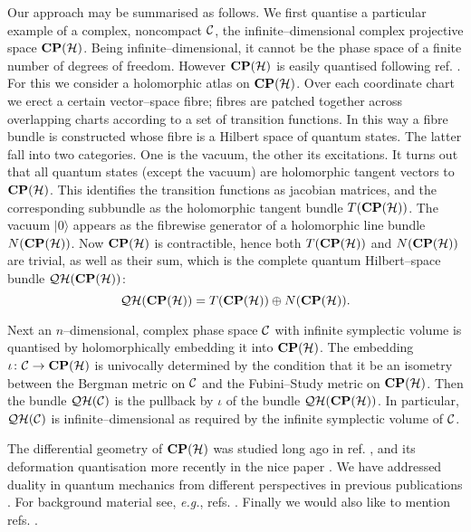 \documentclass[a4paper,a4paper]{article}
\begin{document}
Our approach may be summarised as follows. We first quantise a particular example of a complex, 
noncompact ${\cal C}$, the infinite--dimensional complex projective space ${\bf CP}({\cal H})$. 
Being infinite--dimensional, it cannot be the phase space of a finite number of degrees of freedom. 
However ${\bf CP}({\cal H})$ is easily quantised following ref. \cite{PQM}. For this
we consider a holomorphic atlas on ${\bf CP}({\cal H})$. Over each coordinate chart 
we erect a certain vector--space fibre; fibres are patched together across overlapping charts 
according to a set of transition functions. In this way a fibre bundle is constructed whose fibre 
is a Hilbert space of quantum states. The latter fall into two categories. 
One is the vacuum, the other its excitations. 
It turns out that all quantum states (except the vacuum) are holomorphic tangent vectors 
to ${\bf CP}({\cal H})$. This identifies the transition functions as jacobian matrices, 
and the corresponding subbundle as the holomorphic tangent bundle $T({\bf CP}({\cal H}))$. 
The vacuum $\vert 0\rangle$ appears as the fibrewise generator of a holomorphic line bundle 
$N({\bf CP}({\cal H}))$. Now ${\bf CP}({\cal H})$ is contractible, hence both 
$T({\bf CP}({\cal H}))$ and $N({\bf CP}({\cal H}))$ are trivial, as well as their sum, which is 
the complete quantum Hilbert--space bundle ${\cal QH}({\bf CP}({\cal H}))$:
\begin{equation}
{\cal QH}({\bf CP}({\cal H}))=T({\bf CP}({\cal H}))\oplus N({\bf CP}({\cal H})).
\label{compelto}
\end{equation}

Next an $n$--dimensional, complex phase space ${\cal C}$ with infinite symplectic 
volume is quantised by holomorphically embedding it into ${\bf CP}({\cal 
H})$. The embedding $\iota\colon {\cal C}\rightarrow {\bf CP}({\cal H})$ 
is univocally determined by the condition that it be an isometry between 
the Bergman metric on ${\cal C}$ and the Fubini--Study metric on ${\bf CP}({\cal H})$. 
Then the bundle ${\cal QH}({\cal C})$ is the pullback by $\iota$ of the 
bundle ${\cal QH}({\bf CP}({\cal H}))$. 
In particular, ${\cal QH}({\cal C})$ is infinite--dimensional as required by the 
infinite symplectic volume of ${\cal C}$.

The differential geometry of ${\bf CP}({\cal H})$ was studied long ago in ref. \cite{CPINF},
and its deformation quantisation more recently in the nice paper \cite{MEX}. 
We have addressed duality in quantum mechanics from different perspectives 
in previous publications \cite{MEPREV}. For background material see, 
{\it e.g.}, refs. \cite{KN, LIBAZCA, LIBSCHLICHENMAIER, BRUZZO}. 
Finally we would also like to mention refs. \cite{MATONE, ANANDAN, FUJII}.
\end{document}
